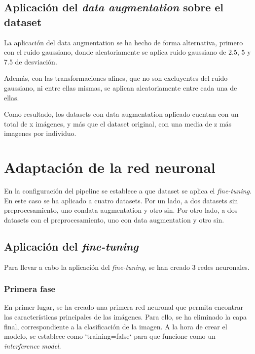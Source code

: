 \subsection{Aplicación del \textit{data augmentation} sobre el dataset}

La aplicación del data augmentation se ha hecho de forma alternativa, primero con el ruido gaussiano, donde aleatoriamente se aplica ruido gaussiano de 2.5, 5 y 7.5 de desviación. 

Además, con las transformaciones afines, que no son excluyentes del ruido gaussiano, ni entre ellas mismas, se aplican aleatoriamente entre cada una de ellas. 

Como resultado, los datasets con data augmentation aplicado cuentan con un total de x imágenes, y más que el dataset original, con una media de z más imagenes por individuo. 

\section{Adaptación de la red neuronal}

En la configuración del pipeline se establece a que dataset se aplica el \textit{fine-tuning}. En este caso se ha aplicado a cuatro datasets. 
Por un lado, a dos datasets sin preprocesamiento, uno condata augmentation y otro sin. Por otro lado, a dos datasets con el preprocesamiento, uno con data augmentation y otro sin. 

\subsection{Aplicación del \textit{fine-tuning}}


Para llevar a cabo la aplicación del \textit{fine-tuning}, se han creado 3 redes neuronales.

\subsubsection{Primera fase}


En primer lugar, se ha creado una primera red neuronal que permita encontrar las características principales de las imágenes.
Para ello, se ha eliminado la capa final, correspondiente a la clasificación de la imagen.
A la hora de crear el modelo, se establece como `training=false` para que funcione como un \textit{interference model}.

